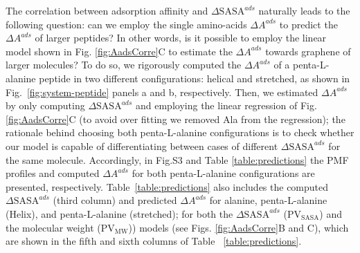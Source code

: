 \documentclass[journal=jcisd8,manuscript=article,layout=twocolumn]{achemso}
\begin{document}
The correlation between adsorption affinity and $\Delta \textrm{SASA}^{ads}$ naturally leads to the following question: can we employ the single amino-acids $\Delta A^{ads}$ to predict the $\Delta A^{ads}$ of larger peptides?
In other words, is it possible to employ the linear model shown in Fig. \ref{fig:AadsCorre}C to estimate the $\Delta A^{ads}$ towards graphene of larger molecules?
To do so, we rigorously computed the $\Delta A^{ads}$ of a penta-L-alanine peptide  in two different configurations: helical and stretched, as shown in Fig.~\ref{fig:system-peptide} panels a and b, respectively.
Then, we estimated $\Delta A^{ads}$ by only computing  $\Delta \textrm{SASA}^{ads}$ and employing the linear regression of Fig. \ref{fig:AadsCorre}C (to avoid over fitting we removed Ala from the regression); the rationale behind choosing both penta-L-alanine configurations is to check whether our model is capable of differentiating between cases of different $\Delta \textrm{SASA}^{ads}$ for the same molecule.
Accordingly, in Fig.S3 and Table \ref{table:predictions} the PMF profiles and computed $\Delta A^{ads}$  for both penta-L-alanine configurations are presented, respectively.
Table~\ref{table:predictions} also includes the computed $\Delta \textrm{SASA}^{ads}$ (third column) and predicted $\Delta A^{ads}$ for alanine, penta-L-alanine (Helix), and penta-L-alanine (stretched); for both the $\Delta \textrm{SASA}^{ads}$ (PV$_{\textrm{SASA}}$) and the molecular weight (PV$_{\textrm{MW}}$)) models (see Figs. \ref{fig:AadsCorre}B and C), which are shown in the fifth and sixth columns of Table ~\ref{table:predictions}.
\end{document}
